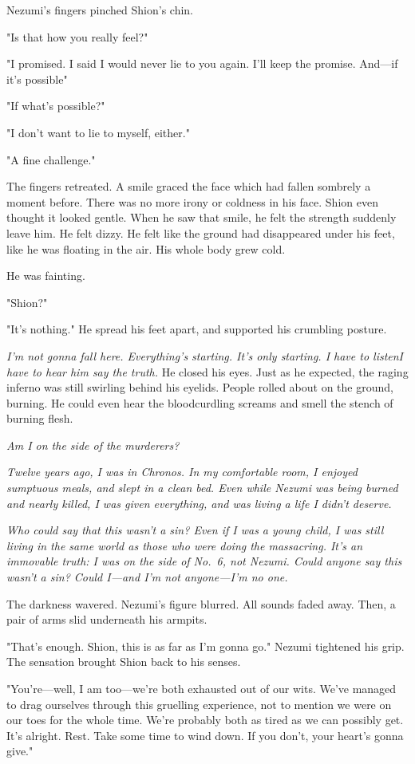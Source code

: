 Nezumi's fingers pinched Shion's chin.

"Is that how you really feel?"

"I promised. I said I would never lie to you again. I'll keep the
promise. And---if it's possible\el "

"If what's possible?"

"I don't want to lie to myself, either."

"A fine challenge."

The fingers retreated. A smile graced the face which had fallen sombrely
a moment before. There was no more irony or coldness in his face. Shion
even thought it looked gentle. When he saw that smile, he felt the
strength suddenly leave him. He felt dizzy. He felt like the ground had
disappeared under his feet, like he was floating in the air. His whole
body grew cold.

He was fainting.

"Shion?"

"It's nothing." He spread his feet apart, and supported his crumbling
posture.

\emph{I'm not gonna fall here. Everything's starting. It's only starting. I
have to listen\el I have to hear him say the truth.} He closed his eyes.
Just as he expected, the raging inferno was still swirling behind his
eyelids. People rolled about on the ground, burning. He could even hear
the bloodcurdling screams and smell the stench of burning flesh.

\emph{Am I on the side of the murderers?}

\emph{Twelve years ago, I was in Chronos. In my comfortable room, I enjoyed
sumptuous meals, and slept in a clean bed. Even while Nezumi was being
burned and nearly killed, I was given everything, and was living a life
I didn't deserve.}

\emph{Who could say that this wasn't a sin? Even if I was a young child, I was
still living in the same world as those who were doing the massacring.
It's an immovable truth: I was on the side of No.~6, not Nezumi. Could
anyone say this wasn't a sin? Could I---and I'm not anyone---I'm no one.}

The darkness wavered. Nezumi's figure blurred. All sounds faded away.
Then, a pair of arms slid underneath his armpits.

"That's enough. Shion, this is as far as I'm gonna go." Nezumi tightened
his grip. The sensation brought Shion back to his senses.

"You're---well, I am too---we're both exhausted out of our wits. We've
managed to drag ourselves through this gruelling experience, not to
mention we were on our toes for the whole time. We're probably both as
tired as we can possibly get. It's alright. Rest. Take some time to wind
down. If you don't, your heart's gonna give."

